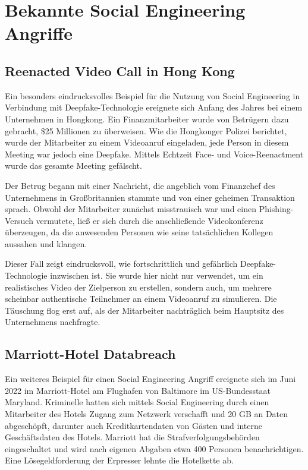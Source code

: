 \section{Bekannte Social Engineering Angriffe}\label{sec:bekannte-social-engineering-angriffe}
\subsection*{Reenacted Video Call in Hong Kong}
Ein besonders eindrucksvolles Beispiel für die Nutzung von Social Engineering in Verbindung mit Deepfake-Technologie
ereignete sich Anfang des Jahres bei einem Unternehmen in Hongkong.
Ein Finanzmitarbeiter wurde von Betrügern dazu gebracht, \$25 Millionen zu überweisen.
Wie die Hongkonger Polizei berichtet, wurde der Mitarbeiter zu einem Videoanruf eingeladen, jede Person in diesem
Meeting war jedoch eine Deepfake. Mittels Echtzeit Face- und Voice-Reenactment wurde das gesamte Meeting gefälscht.

Der Betrug begann mit einer Nachricht, die angeblich vom Finanzchef des Unternehmens in Großbritannien stammte und von einer geheimen Transaktion sprach. Obwohl der Mitarbeiter zunächst misstrauisch war und einen Phishing-Versuch vermutete, ließ er sich durch die anschließende Videokonferenz überzeugen, da die anwesenden Personen wie seine tatsächlichen Kollegen aussahen und klangen.

Dieser Fall zeigt eindrucksvoll, wie fortschrittlich und gefährlich Deepfake-Technologie inzwischen ist. Sie wurde
hier nicht nur verwendet, um ein realistisches Video der Zielperson zu erstellen, sondern auch, um mehrere scheinbar
authentische Teilnehmer an einem Videoanruf zu simulieren. Die Täuschung flog erst auf, als der Mitarbeiter
nachträglich beim Hauptsitz des Unternehmens nachfragte\cite{cnn-deepfake-scam-hong-kong}.

\subsection*{Marriott-Hotel Databreach}
Ein weiteres Beispiel für einen Social Engineering Angriff ereignete sich im Juni 2022 im Marriott-Hotel am Flughafen von Baltimore im US-Bundesstaat Maryland. Kriminelle hatten sich mittels Social Engineering durch einen Mitarbeiter des Hotels Zugang zum Netzwerk verschafft und 20 GB an Daten abgeschöpft, darunter auch Kreditkartendaten von Gästen und interne Geschäftsdaten des Hotels. Marriott hat die Strafverfolgungsbehörden eingeschaltet und wird nach eigenen Abgaben etwa 400 Personen benachrichtigen. Eine Lösegeldforderung der Erpresser lehnte die Hotelkette ab\cite{marriott-data-breach}.

